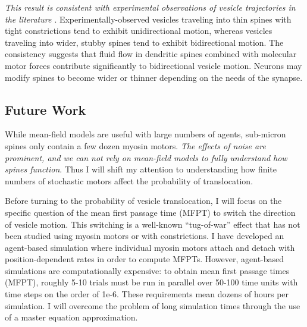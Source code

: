 \documentclass[a4paper,11pt]{article}
\begin{document}
\textit{This result is consistent with experimental observations of vesicle trajectories in the literature \cite{park2020dynamics}}. Experimentally-observed vesicles traveling into thin spines with tight constrictions tend to exhibit unidirectional motion, whereas vesicles traveling into wider, stubby spines tend to exhibit bidirectional motion. The consistency suggests that fluid flow in dendritic spines combined with molecular motor forces contribute significantly to bidirectional vesicle motion. Neurons may modify spines to become wider or thinner depending on the needs of the synapse.

\subsection{Future Work}
While mean-field models are useful with large numbers of agents, sub-micron spines only contain a few dozen myosin motors. \textit{The effects of noise are prominent, and we can not rely on mean-field models to fully understand how spines function}. Thus I will shift my attention to understanding how finite numbers of stochastic motors affect the probability of translocation.

Before turning to the probability of vesicle translocation, I will focus on the specific question of the mean first passage time (MFPT) to switch the direction of vesicle motion. This switching is a well-known ``tug-of-war'' effect \cite{julicher1995cooperative} that has not been studied using myosin motors or with constrictions. I have developed an agent-based simulation where individual myosin motors attach and detach with position-dependent rates in order to compute MFPTs. However, agent-based simulations are computationally expensive: to obtain mean first passage times (MFPT), roughly 5-10 trials must be run in parallel over 50-100 time units with time steps on the order of 1e-6. These requirements mean dozens of hours per simulation. I will overcome the problem of long simulation times through the use of a master equation approximation.

\end{document}
